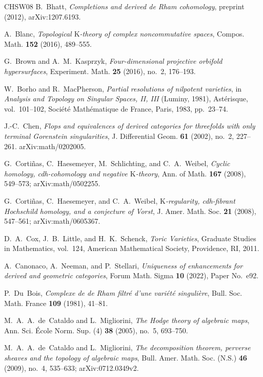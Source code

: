 \documentclass{amsart}
\theoremstyle{plain}
\theoremstyle{definition}
\newcommand{\K}{\mathrm{K}}
\begin{document}
\begin{thebibliography}{CHSW08}
B.~Bhatt,
\emph{Completions and derived de Rham cohomology}, preprint (2012), arXiv:1207.6193.

A.~Blanc,
\emph{Topological $\K$-theory of complex noncommutative spaces}, Compos. Math. \textbf{152} (2016), 489--555.


G.~Brown and A.~M.~Kasprzyk,
\emph{Four-dimensional projective orbifold hypersurfaces}, Experiment. Math. \textbf{25} (2016), no.~2, 176--193.


W.~Borho and R.~MacPherson,
\emph{Partial resolutions of nilpotent varieties}, in \emph{Analysis and Topology on Singular Spaces, II, III}
(Luminy, 1981), Ast\'erisque, vol.~101--102, Soci\'et\'e Math\'ematique de France, Paris, 1983, pp.~23--74.

J.-C.~Chen,
\emph{Flops and equivalences of derived categories for threefolds with only terminal Gorenstein singularities}, J. Differential Geom. \textbf{61} (2002), no.~2, 227--261.
arXiv:math/0202005.



G.~Corti\~nas, C.~Haesemeyer, M.~Schlichting, and C.~A.~Weibel,
\emph{Cyclic homology, cdh-cohomology and negative $\K$-theory}, Ann. of Math. \textbf{167} (2008), 549--573; arXiv:math/0502255.

G.~Corti\~nas, C.~Haesemeyer, and C.~A.~Weibel,
\emph{$\K$-regularity, cdh-fibrant Hochschild homology, and a conjecture of Vorst}, J. Amer. Math. Soc. \textbf{21} (2008), 547--561;
arXiv:math/0605367.


D.~A.~Cox, J.~B.~Little, and H.~K.~Schenck,
\emph{Toric Varieties}, Graduate Studies in Mathematics, vol.~124, American Mathematical Society, Providence, RI, 2011.

A.~Canonaco, A.~Neeman, and P.~Stellari,
\emph{Uniqueness of enhancements for derived and geometric categories}, Forum Math. Sigma \textbf{10} (2022), Paper No.~e92.

P.~Du~Bois, \emph{Complexe de de Rham filtr\'e d'une vari\'et\'e singuli\`ere}, Bull. Soc. Math. France \textbf{109} (1981), 41--81.

M.~A.~A.~de~Cataldo and L.~Migliorini,
\emph{The Hodge theory of algebraic maps}, Ann. Sci. \'Ecole Norm. Sup. (4) \textbf{38} (2005), no.~5, 693--750.


M.~A.~A.~de~Cataldo and L.~Migliorini,
\emph{The decomposition theorem, perverse sheaves and the topology of algebraic maps}, Bull. Amer. Math. Soc. (N.S.) \textbf{46} (2009), no.~4, 535--633;
arXiv:0712.0349v2.


\end{thebibliography}
\end{document}
